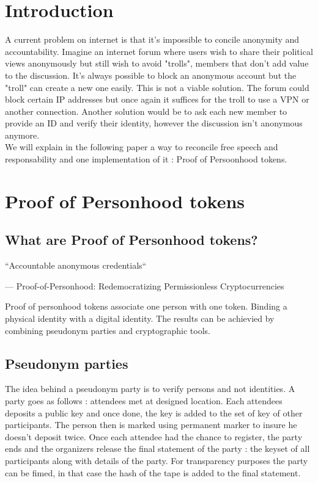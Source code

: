 \documentclass[11pt, a4paper, twoside, openright]{book} %
\begin{document}



\newpage

\section{Introduction}
A current problem on internet is that it's impossible to concile anonymity and accountability. Imagine an internet forum where users wish to share their political views anonymously but still wish to avoid "trolls", members that don't add value to the discussion. It's always possible to block an anonymous account but the "troll" can create a new one easily. This is not a viable solution. The forum could block certain IP addresses but once again it suffices for the troll to use a VPN or another connection. Another solution would be to ask each new member to provide an ID and verify their identity, however the discussion isn't anonymous anymore. \\
We will explain in the following paper a way to reconcile free speech and responsability and one implementation of it : Proof of Persoonhood tokens.



\section{Proof of Personhood tokens}
\subsection{What are Proof of Personhood tokens?}

\epigraph{``Accountable anonymous credentials``}
{--- \textup{Proof-of-Personhood: Redemocratizing Permissionless Cryptocurrencies}}

Proof of personhood tokens associate one person with one token. Binding a physical identity with a digital identity. The results can be achievied by combining pseudonym parties and cryptographic tools.

\subsection{Pseudonym parties}

The idea behind a pseudonym party is to verify persons and not identities. A party goes as follows :  attendees met at designed location. Each attendees deposits a public key and once done, the key is added to the set of key of other participants. The person then is marked using permanent marker to insure he doesn't deposit twice. Once each attendee had the chance to register, the party ends and the organizers release the final statement of the party : the keyset of all participants along with details of the party. For transparency purposes the party can be fimed, in that case the hash of the tape is added to the final statement. 
 
\end{document}
